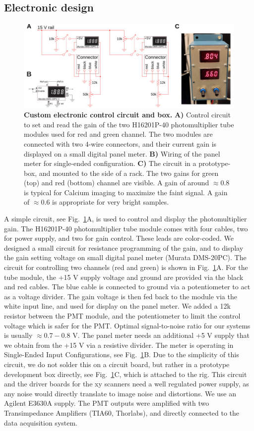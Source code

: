\documentclass[10pt,letterpaper]{article}
\begin{document}
\subsection*{Electronic design}
%
\begin{figure}[!t]
    \includegraphics[width=\textwidth]{fig4.jpg}
    \caption{{\bf Custom electronic control circuit and box.} \textbf{A)} Control circuit to set and read the gain of the two H16201P-40 photomultiplier tube modules used for red and green channel. The two modules are connected with two 4-wire connectors, and their current gain is displayed on a small digital panel meter. \textbf{B)} Wiring of the panel meter for single-ended configuration. \textbf{C)} The circuit in a prototype-box, and mounted to the side of a rack. The two gains for green (top) and red (bottom) channel are visible. A gain of around $\approx0.8$ is typical for Calcium imaging to maximize the faint signal. A gain of $\approx0.6$ is appropriate for very bright samples.}
    \label{fig4}
\end{figure}
%
A simple circuit, see Fig.~\ref{fig4}A, is used to control and display the photomultiplier gain. The H16201P-40 photomultiplier tube module comes with four cables, two for power supply, and two for gain control. These leads are color-coded. We designed a small circuit for resistance programming of the gain, and to display the gain setting voltage on small digital panel meter (Murata DMS-20PC). The circuit for controlling two channels (red and green) is shown in Fig.~\ref{fig4}A. For the tube module, the +15 V supply voltage and ground are provided via the black and red cables. The blue cable is connected to ground via a potentiometer to act as a voltage divider. The gain voltage is then fed back to the module via the white input line, and used for display on the panel meter. We added a 12k resistor between the PMT module, and the potentiometer to limit the control voltage which is safer for the PMT. Optimal signal-to-noise ratio for our systems is usually $\approx 0.7-0.8\text{ V}$. The panel meter needs an additional +5 V supply that we obtain from the +15 V via a resistive divider. The meter is operating in Single-Ended Input Conﬁgurations, see Fig.~\ref{fig4}B. Due to the simplicity of this circuit, we do not solder this on a circuit board, but rather in a prototype development box directly, see Fig.~\ref{fig4}C, which is attached to the rig.\newline
This circuit and the driver boards for the xy scanners need a well regulated power supply, as any noise would directly translate to image noise and distortions. We use an Agilent E3630A supply. The PMT outputs were amplified with two Transimpedance Amplifiers (TIA60, Thorlabs), and directly connected to the data acquisition system.
\end{document}
